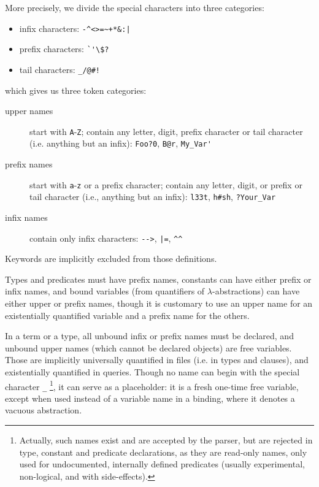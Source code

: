 More precisely, we divide the special characters into three categories:
\begin{itemize}
  \item infix characters: \lstinline{-^<>=~+*&:|}
  \item prefix characters: \lstinline{`'\$?}
  \item tail characters: \lstinline{_/@#!}
\end{itemize}
which gives us three token categories:
\begin{description}
  \item[upper names] start with \lstinline{A}-\lstinline{Z}; contain any
    letter, digit, prefix character or tail character (i.e. anything but
    an infix): \lstinline{Foo?0}, \lstinline{B@r}, \lstinline{My_Var'}

  \item[prefix names] start with \lstinline{a}-\lstinline{z} or a prefix
    character; contain any letter, digit, or prefix or tail character
    (i.e., anything but an infix): \lstinline{l33t}, \lstinline{h#sh},
    \lstinline{?Your_Var}

  \item[infix names] contain only infix characters: \lstinline{-->},
    \lstinline{|=}, \lstinline{^^}
\end{description}
Keywords are implicitly excluded from those definitions.

Types and predicates must have prefix names, constants can have either
prefix or infix names, and bound variables (from quantifiers of
$\lambda$-abstractions) can have either upper or prefix names, though it
is customary to use an upper name for an existentially quantified
variable and a prefix name for the others.

In a term or a type, all unbound infix or prefix names must be declared,
and unbound upper names (which cannot be declared objects) are free
variables.  Those are implicitly universally quantified in files (i.e.
in types and clauses), and existentially quantified in queries.  Though
no name can begin with the special character \lstinline{_}%
\footnote{Actually, such names exist and are accepted by the parser, but
  are rejected in type, constant and predicate declarations, as they are
  read-only names, only used for undocumented, internally defined
  predicates (usually experimental, non-logical, and with side-effects).
}, it can serve as a placeholder: it is a fresh one-time free variable,
except when used instead of a variable name in a binding, where it
denotes a vacuous abstraction.

